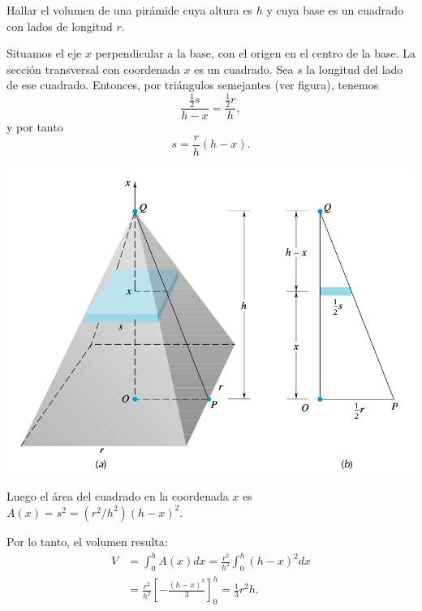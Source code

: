 \begin{example}
  Hallar el volumen de una pirámide cuya altura es \( h \) y cuya base es un cuadrado con lados de longitud \( r \).


  \noindent\begin{minipage}{.6\textwidth}
    Situamos el eje \( x \) perpendicular a la base, con el origen en el centro de la base. La sección transversal con coordenada \( x \) es un cuadrado. Sea \( s \) la longitud del lado de ese cuadrado. Entonces, por triángulos semejantes (ver figura), tenemos
    \[
    \frac{\frac{1}{2}s}{h - x} = \frac{\frac{1}{2}r}{h},
    \]
    y por tanto
    \[
    s = \frac{r}{h}(h - x).
    \]
  
  \end{minipage}
  \begin{minipage}{.39\textwidth}
    \begin{center}
      \includegraphics[width=.9\textwidth]{pics/piramide.png}
    \end{center}
  \end{minipage}
  
  Luego el área del cuadrado en la coordenada $x$ es $A(x) = s^2 = (r^2/h^2)(h-x)^2$.

Por lo tanto, el volumen resulta:
\begin{align*}
  V &= \int_0^h A(x) dx = \frac{r^2}{h^2} \int_0^h (h-x)^2 dx\\
&= \frac{r^2}{h^2} \left[-\frac{(h-x)^3}{3}\right]_0^h = \frac{1}{3} r^2 h.
\end{align*}

\end{example}

